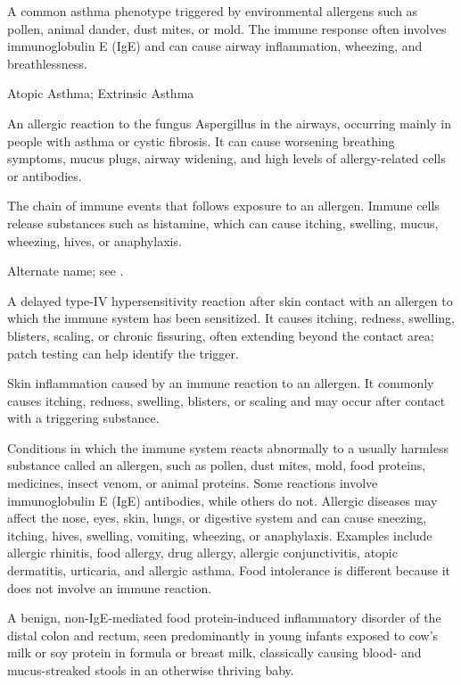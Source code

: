  A common asthma phenotype triggered by environmental
allergens such as pollen, animal dander, dust mites, or mold. The immune
response often involves immunoglobulin E (IgE) and can cause airway
inflammation, wheezing, and breathlessness.

\synonyms
Atopic Asthma; Extrinsic Asthma

 An allergic reaction to the fungus Aspergillus in the airways, occurring mainly in people with asthma or cystic fibrosis. It can cause worsening breathing symptoms, mucus plugs, airway widening, and high levels of allergy-related cells or antibodies.

 The chain of immune events that follows exposure to an allergen. Immune cells release substances such as histamine, which can cause itching, swelling, mucus, wheezing, hives, or anaphylaxis.

 Alternate name; see .

 A delayed type-IV hypersensitivity reaction after skin contact with an allergen to which the immune system has been sensitized. It causes itching, redness, swelling, blisters, scaling, or chronic fissuring, often extending beyond the contact area; patch testing can help identify the trigger.

 Skin inflammation caused by an immune reaction to an allergen. It commonly causes itching, redness, swelling, blisters, or scaling and may occur after contact with a triggering substance.

 Conditions in which the immune system reacts abnormally to a usually harmless substance called an allergen, such as pollen, dust mites, mold, food proteins, medicines, insect venom, or animal proteins. Some reactions involve immunoglobulin E (IgE) antibodies, while others do not. Allergic diseases may affect the nose, eyes, skin, lungs, or digestive system and can cause sneezing, itching, hives, swelling, vomiting, wheezing, or anaphylaxis. Examples include allergic rhinitis, food allergy, drug allergy, allergic conjunctivitis, atopic dermatitis, urticaria, and allergic asthma. Food intolerance is different because it does not involve an immune reaction.

 A benign, non-IgE-mediated food protein-induced inflammatory disorder of the distal colon and rectum, seen predominantly in young infants exposed to cow's milk or soy protein in formula or breast milk, classically causing blood- and mucus-streaked stools in an otherwise thriving baby.

